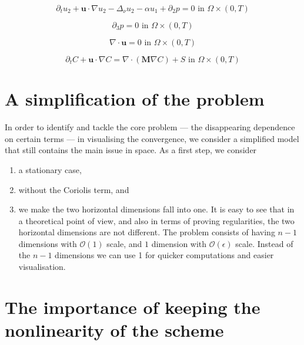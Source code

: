 \documentclass[11pt]{article}
\begin{document}
    \begin{equation} \label{HNSC2}   
    \partial_t u_2 + \mathbf{u} \cdot \nabla u_2 - \Delta_\nu u_2 -\alpha u_1 + \partial_2 p = 0 \text{ in } \Omega \times (0,T)
    \end{equation}
    
    \begin{equation} \label{HNSC3}   
    \partial_3 p = 0 \text{ in } \Omega \times (0,T)
    \end{equation}
    
    \begin{equation} \label{HNSC4}   
    \nabla \cdot \mathbf{u} = 0 \text{ in } \Omega \times (0,T)
    \end{equation}
    
    \begin{equation} \label{HNSC5}   
    \partial_t C + \mathbf{u} \cdot \nabla C = \nabla \cdot (\mathbf{M} \nabla C) + S \text{ in } \Omega \times (0,T)
    \end{equation}
    
\section{A simplification of the problem}

In order to identify and tackle the core problem --- the disappearing dependence on certain terms --- in visualising the convergence, we consider a simplified model that still contains the main issue in space. As a first step, we consider

\begin{enumerate}
  \item a stationary case,
  \item without the Coriolis term, and
  \item we make the two horizontal dimensions fall into one. It is easy to see that in a theoretical point of view, and also in terms of proving regularities, the two horizontal dimensions are not different. The problem consists of having $n-1$ dimensions with $\mathcal{O}(1)$ scale, and $1$ dimension with $\mathcal{O}(\epsilon)$ scale. Instead of the $n-1$ dimensions we can use 1 for quicker computations and easier visualisation.
\end{enumerate}

\section{The importance of keeping the nonlinearity of the scheme}
\end{document}
